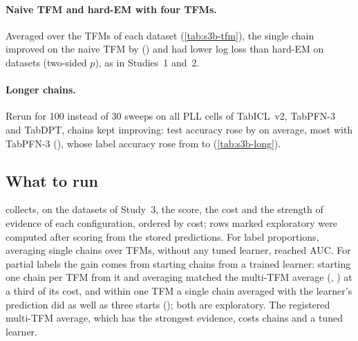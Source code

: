 \paragraph{Naive TFM and hard-EM with four TFMs.} Averaged over the TFMs of each dataset (\cref{tab:s3b-tfm}), the
single chain improved on the naive TFM by  () and had lower
log loss than hard-EM on  datasets (two-sided $p$), as in Studies~1 and~2.

\paragraph{Longer chains.} Rerun for 100 instead of 30 sweeps on all  PLL cells of TabICL~v2, TabPFN-3 and
TabDPT, chains kept improving: test accuracy rose by  on average, most with TabPFN-3
(), whose label accuracy rose from  to
 (\cref{tab:s3b-long}).

\subsection{What to run}\label{sec:recommend}
 collects, on the datasets of Study~3, the score, the cost and the strength of evidence of each
configuration, ordered by cost; rows marked exploratory were computed after scoring from the stored predictions. For
label proportions, averaging single chains over TFMs, without any tuned learner, reached  AUC.
For partial labels the gain comes from starting chains from a trained learner: starting one chain per TFM from it and
averaging matched the multi-TFM average (, ) at a third of its
cost, and within one TFM a single chain averaged with the learner's prediction did as well as three starts
(); both are exploratory. The registered multi-TFM average, which has the strongest evidence, costs
 chains and a tuned learner.

\begin{table}[t]
\centering
\caption{Score, cost and evidence of each configuration on the  datasets of Study~3 (means over
datasets; single-TFM rows averaged over the TFMs of each dataset), ordered by cost. A chain costs
 forward passes; the warm start adds  for PLL, where it cross-fits
the TFM. A chain took a median of \,s to
\,s on one T4 GPU in Study~3. All configurations except $L$, GBDT and PL-$k$NN also need the
TFM itself; ``tuned $L$'' adds 20 tuning runs. ``Exploratory'': computed after scoring, without error control.}
\label{tab:recommend}
\footnotesize
\setlength{\tabcolsep}{4pt}

\end{table}

